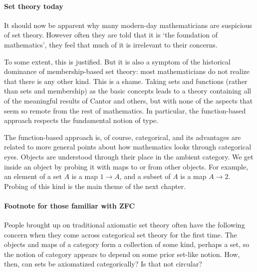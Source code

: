\paragraph*{Set theory today}
It should now be apparent why many modern-day mathematicians are suspicious
of set theory.  However often they are told that it is `the foundation%
%
%
of mathematics', they feel that much of it is irrelevant to their concerns.

To some extent, this is justified.  But it is also a symptom of the
historical dominance of membership-based set theory: most mathematicians do
not realize that there is any other kind.  This is a shame.  Taking sets
and functions (rather than sets and membership) as the basic concepts leads
to a theory containing all of the meaningful results of Cantor and others,
but with none of the aspects that seem so remote from the rest of
mathematics.  In particular, the function-based approach respects the
fundamental notion of type.%
%
%

The function-based approach is, of course, categorical, and its advantages
are related to more general points about how mathematics looks through
categorical eyes.  Objects are understood through their place in the
ambient category.  We get inside an object by probing%
%
%
it with maps to or from other objects.  For example, an element of a set
$A$ is a map $1 \to A$, and a subset of $A$ is a map $A \to 2$.  Probing of
this kind is the main theme of the next chapter.

\paragraph*{Footnote for those familiar with ZFC}
People brought up on traditional axiomatic set theory often have the
following concern when they come across categorical set theory for the
first time.  The objects and maps of a category form a collection of some
kind, perhaps a set, so the notion of category appears to depend on some
prior set-like notion.  How, then, can sets be axiomatized categorically?
Is that not circular?

